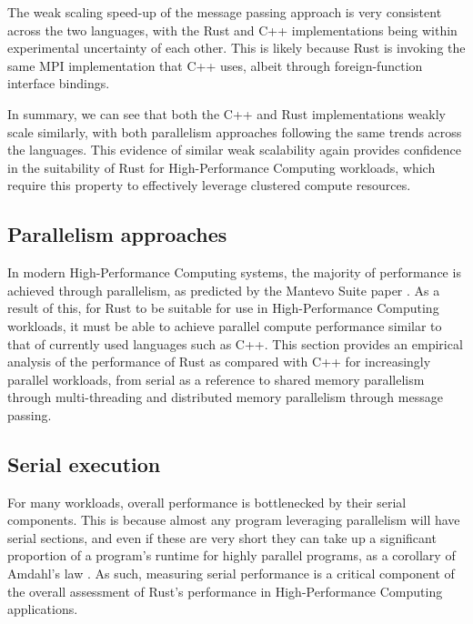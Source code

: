 The weak scaling speed-up of the message passing approach is very consistent across the two languages, with the Rust and C++ implementations being within experimental uncertainty of each other. This is likely because Rust is invoking the same MPI implementation that C++ uses, albeit through foreign-function interface bindings.

In summary, we can see that both the C++ and Rust implementations weakly scale similarly, with both parallelism approaches following the same trends across the languages. This evidence of similar weak scalability again provides confidence in the suitability of Rust for High-Performance Computing workloads, which require this property to effectively leverage clustered compute resources.




\subsection{Parallelism approaches}
\label{ssec:parallelism-approaches}

In modern High-Performance Computing systems, the majority of performance is achieved through parallelism, as predicted by the Mantevo Suite paper \cite{heroux2013mantevo}. As a result of this, for Rust to be suitable for use in High-Performance Computing workloads, it must be able to achieve parallel compute performance similar to that of currently used languages such as C++. This section provides an empirical analysis of the performance of Rust as compared with C++ for increasingly parallel workloads, from serial as a reference to shared memory parallelism through multi-threading and distributed memory parallelism through message passing.

\subsection{Serial execution}
\label{ssec:serial-execution}

For many workloads, overall performance is bottlenecked by their serial components. This is because almost any program leveraging parallelism will have serial sections, and even if these are very short they can take up a significant proportion of a program's runtime for highly parallel programs, as a corollary of Amdahl's law \cite{amdahlsLaw}. As such, measuring serial performance is a critical component of the overall assessment of Rust's performance in High-Performance Computing applications.

